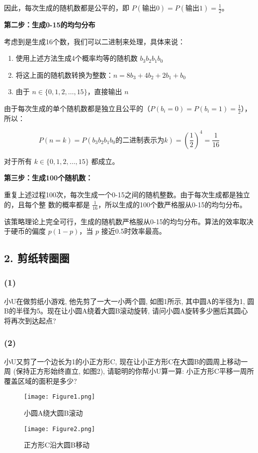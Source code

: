\documentclass[UTF8]{ctexart}
\begin{document}
因此，每次生成的随机数都是公平的，即 $P(\text{输出0}) = P(\text{输出1}) =
\frac{1}{2}$。

\textbf{第二步：生成0-15的均匀分布}

考虑到是生成16个数，我们可以二进制来处理，具体来说：
\begin{enumerate}
    \item 使用上述方法生成4个概率均等的随机数 $b_3b_2b_1b_0$
    \item 将这上面的随机数转换为整数：$n = 8b_3 + 4b_2 + 2b_1 + b_0$
    \item 由于 $n \in \{0,1,2,\ldots,15\}$，直接输出 $n$
\end{enumerate}


由于每次生成的单个随机数都是独立且公平的（$P(b_i = 0) = P(b_i = 1) = \frac{1}{2}$），所以：

$$P(n = k) = P(b_3b_2b_1b_0 \text{的二进制表示为} k) = \left(\frac{1}{2}\right)^4 =
\frac{1}{16}$$

对于所有 $k \in \{0,1,2,\ldots,15\}$ 都成立。

\textbf{第三步：生成100个随机数：}

重复上述过程100次，每次生成一个0-15之间的随机整数。由于每次生成都是独立的，且每个整
数的概率都是 $\frac{1}{16}$，所以生成的100个数严格服从0-15的均匀分布。



该策略理论上完全可行，生成的随机数严格服从0-15的均匀分布。算法的效率取决于硬币的偏度
 $p(1-p)$，当 $p$ 接近0.5时效率最高。

\subsection*{2. 剪纸转圈圈}
\subsubsection*{(1)}
小U在做剪纸小游戏, 他先剪了一大一小两个圆, 如图1所示, 其中圆A的半径为1, 圆B的半径为5。现在让小圆A绕着大圆B滚动旋转, 请问小圆A旋转多少圈后其圆心将再次到达起点?

\subsubsection*{(2)}
小U又剪了一个边长为1的小正方形C, 现在让小正方形C在大圆B的圆周上移动一周 (保持正方形始终直立, 如图2), 请聪明的你帮小U算一算: 小正方形C平移一周所覆盖区域的面积是多少?

\begin{figure}[h!]
    \centering
    \begin{minipage}{0.45\textwidth}
        \centering
        \texttt{[image: Figure1.png]} 
        \caption{小圆A绕大圆B滚动}
        \label{fig:fig1}
    \end{minipage}\hfill
    \begin{minipage}{0.45\textwidth}
        \centering
        \texttt{[image: Figure2.png]}
        \caption{正方形C沿大圆B移动}
        \label{fig:fig2}
    \end{minipage}
\end{figure}
\end{document}
